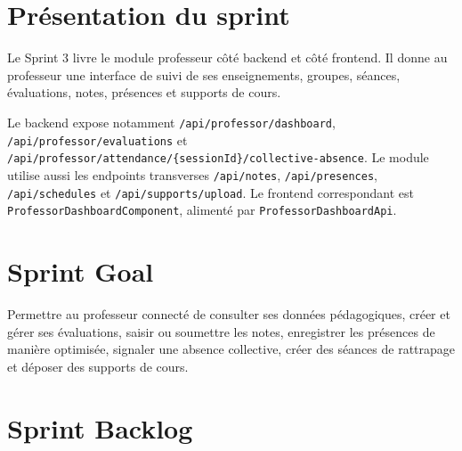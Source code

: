 \documentclass[12pt,a4paper]{report}
\begin{document}
\section{Présentation du sprint}

Le Sprint 3 livre le module professeur côté backend et côté frontend. Il donne au professeur une interface de suivi de ses enseignements, groupes, séances, évaluations, notes, présences et supports de cours.

Le backend expose notamment \texttt{/api/professor/dashboard}, \texttt{/api/professor/evaluations} et \texttt{/api/professor/attendance/\{sessionId\}/collective-absence}. Le module utilise aussi les endpoints transverses \texttt{/api/notes}, \texttt{/api/presences}, \texttt{/api/schedules} et \texttt{/api/supports/upload}. Le frontend correspondant est \texttt{ProfessorDashboardComponent}, alimenté par \texttt{ProfessorDashboardApi}.

\section{Sprint Goal}

Permettre au professeur connecté de consulter ses données pédagogiques, créer et gérer ses évaluations, saisir ou soumettre les notes, enregistrer les présences de manière optimisée, signaler une absence collective, créer des séances de rattrapage et déposer des supports de cours.

\section{Sprint Backlog}
\end{document}

